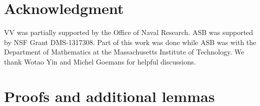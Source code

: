 \documentclass{article}
\newcommand{\1}{\mathbf{1}}
\begin{document}
\section*{Acknowledgment}

VV was partially supported by the Office of Naval Research. ASB was supported by NSF Grant DMS-1317308. Part
of this work was done while ASB was with the Department of
Mathematics at the Massachusetts Institute of Technology. We thank Wotao Yin and Michel Goemans for helpful discussions.







{\small


}

\clearpage

\appendix

\section{Proofs and additional lemmas} \label{sec:proofs}
\end{document}
